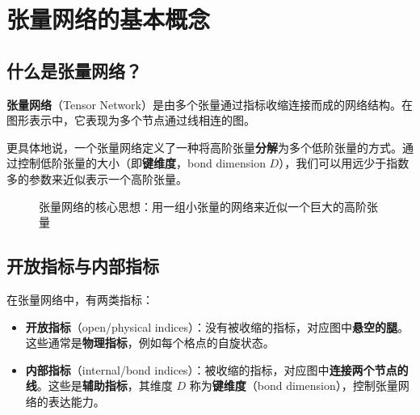 \documentclass[12pt,a4paper]{ctexart}
\begin{document}
\section{张量网络的基本概念}

\subsection{什么是张量网络？}

\begin{keybox}[张量网络的定义]
\textbf{张量网络}（Tensor Network）是由多个张量通过指标收缩连接而成的网络结构。在图形表示中，它表现为多个节点通过线相连的图。
\end{keybox}

更具体地说，一个张量网络定义了一种将高阶张量\textbf{分解}为多个低阶张量的方式。通过控制低阶张量的大小（即\textbf{键维度}，bond dimension $D$），我们可以用远少于指数多的参数来近似表示一个高阶张量。

\begin{figure}[H]
\centering
{}
\caption{张量网络的核心思想：用一组小张量的网络来近似一个巨大的高阶张量}
\end{figure}

\subsection{开放指标与内部指标}

在张量网络中，有两类指标：

\begin{itemize}
    \item \textbf{开放指标}（open/physical indices）：没有被收缩的指标，对应图中\textbf{悬空的腿}。这些通常是\textbf{物理指标}，例如每个格点的自旋状态。
    \item \textbf{内部指标}（internal/bond indices）：被收缩的指标，对应图中\textbf{连接两个节点的线}。这些是\textbf{辅助指标}，其维度 $D$ 称为\textbf{键维度}（bond dimension），控制张量网络的表达能力。
\end{itemize}
\end{document}
